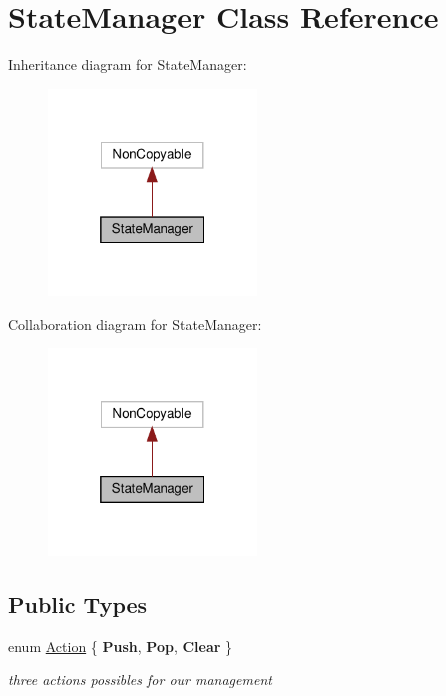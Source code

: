\hypertarget{classStateManager}{}\section{State\+Manager Class Reference}
\label{classStateManager}


Inheritance diagram for State\+Manager\+:
\nopagebreak
\begin{figure}[H]
\begin{center}
\leavevmode
\includegraphics[width=157pt]{classStateManager__inherit__graph}
\end{center}
\end{figure}


Collaboration diagram for State\+Manager\+:
\nopagebreak
\begin{figure}[H]
\begin{center}
\leavevmode
\includegraphics[width=157pt]{classStateManager__coll__graph}
\end{center}
\end{figure}
\subsection*{Public Types}
\begin{DoxyCompactItemize}
\item 
\mbox{\label{classStateManager_a9f2dbb42af0109d58245e9d361df7a7b}} 
enum \hyperlink{classStateManager_a9f2dbb42af0109d58245e9d361df7a7b}{Action} \{ {\bfseries Push}, 
{\bfseries Pop}, 
{\bfseries Clear}
 \}\begin{DoxyCompactList}\small\item\em three actions possibles for our management \end{DoxyCompactList}
\end{DoxyCompactItemize}
